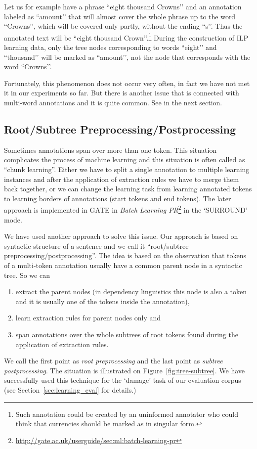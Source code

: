 Let us for example have a phrase ``eight thousand Crowns’’ and an annotation labeled as ``amount’’ that will almost cover the whole phrase up to the word ``Crowns’’, which will be covered only partly, without the ending ``s’’. Thus the annotated text will be ``eight thousand Crown’’.\footnote{Such annotation could be created by an uninformed annotator who could think that currencies should be marked as in singular form.} During the construction of ILP learning data, only the tree nodes corresponding to words ``eight’’ and ``thousand’’ will be marked as ``amount’’, not the node that corresponds with the word ``Crowns’’.

Fortunately, this phenomenon does not occur very often, in fact we have not met it in our experiments so far. But there is another issue that is connected with multi-word annotations and it is quite common. See in the next section.


\subsection{Root/Subtree Preprocessing/Postprocessing} \label{sec:learning_root_subtree}
Sometimes annotations span over more than one token. This situation complicates the process of machine learning and this situation is often called as ``chunk learning''. Either we have to split a single annotation to multiple learning instances and after the application of extraction rules we have to merge them back together, or we can change the learning task from learning annotated tokens to learning borders of annotations (start tokens and end tokens). The later approach is implemented in GATE in \emph{Batch Learning PR}\footnote{\url{http://gate.ac.uk/userguide/sec:ml:batch-learning-pr}} in the `SURROUND' mode.

We have used another approach to solve this issue. Our approach is based on syntactic structure of a sentence and we call it ``root/subtree preprocessing/postprocessing''. The idea is based on the observation that tokens of a multi-token annotation usually have a common parent node in a syntactic tree. So we can
\begin{enumerate}
	\item extract the parent nodes (in dependency linguistics this node is also a token and it is usually one of the tokens inside the annotation), 
	\item learn extraction rules for parent nodes only and 
	\item span annotations over the whole subtrees of root tokens found during the application of extraction rules.
\end{enumerate}
We call the first point as \emph{root preprocessing} and the last point as \emph{subtree postprocessing}. The situation is illustrated on Figure~\ref{fig:tree-subtree}. We have successfully used this technique for the `damage' task of our evaluation corpus (see Section~\ref{sec:learning_eval} for details.)

